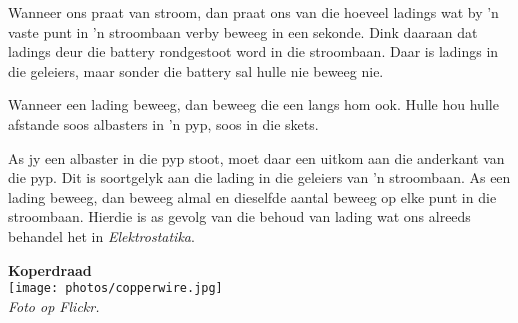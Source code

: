 Wanneer ons praat van stroom, dan praat ons van die hoeveel ladings wat by 'n vaste punt
in 'n stroombaan verby beweeg in een sekonde. Dink daaraan dat ladings deur die
battery rondgestoot word in die stroombaan. Daar is ladings in die geleiers,
maar sonder die battery sal hulle nie beweeg nie.\\
\begin{minipage}{.5\textwidth}
Wanneer een lading beweeg, dan beweeg die een langs hom ook. Hulle hou hulle
afstande soos albasters in 'n pyp, soos in die skets.
\begin{center}
\end{center}
As jy een albaster in die pyp stoot, moet daar een uitkom aan die anderkant van
die pyp. Dit is soortgelyk aan die lading in die geleiers van 'n stroombaan. As
een lading beweeg, dan beweeg almal en dieselfde aantal beweeg op elke punt in
die stroombaan. Hierdie is as gevolg van die behoud van lading wat ons alreeds
behandel het in \textsl{Elektrostatika}.
 \end{minipage}
\begin{minipage}{.5\textwidth}
\begin{center}
\textbf{Koperdraad}\\
\texttt{[image: photos/copperwire.jpg]}\\
\textit{Foto op Flickr.}
\end{center}  
\end{minipage}


